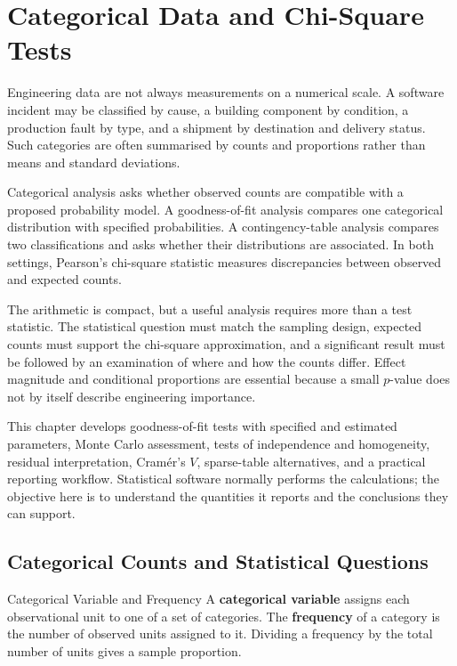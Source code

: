 \chapter{Categorical Data and Chi-Square Tests}
\label{ch:categorical-data}

Engineering data are not always measurements on a numerical scale. A software incident may be classified by cause, a building component by condition, a production fault by type, and a shipment by destination and delivery status. Such categories are often summarised by counts and proportions rather than means and standard deviations.

Categorical analysis asks whether observed counts are compatible with a proposed probability model. A goodness-of-fit analysis compares one categorical distribution with specified probabilities. A contingency-table analysis compares two classifications and asks whether their distributions are associated. In both settings, Pearson's chi-square statistic measures discrepancies between observed and expected counts.

The arithmetic is compact, but a useful analysis requires more than a test statistic. The statistical question must match the sampling design, expected counts must support the chi-square approximation, and a significant result must be followed by an examination of where and how the counts differ. Effect magnitude and conditional proportions are essential because a small $p$-value does not by itself describe engineering importance.

This chapter develops goodness-of-fit tests with specified and estimated parameters, Monte Carlo assessment, tests of independence and homogeneity, residual interpretation, Cram\'er's $V$, sparse-table alternatives, and a practical reporting workflow. Statistical software normally performs the calculations; the objective here is to understand the quantities it reports and the conclusions they can support.

\section{Categorical Counts and Statistical Questions}
\label{sec:categorical-questions}

\begin{definition}{Categorical Variable and Frequency}
A \textbf{categorical variable} assigns each observational unit to one of a set of categories. The \textbf{frequency} of a category is the number of observed units assigned to it. Dividing a frequency by the total number of units gives a sample proportion.
\end{definition}

